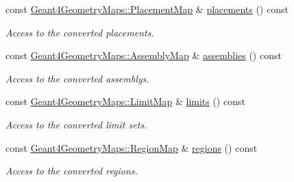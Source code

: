 \begin{Indent}{\bf }
\begin{DoxyCompactItemize}
const \hyperlink{namespace_d_d4hep_1_1_simulation_1_1_geant4_geometry_maps_a587c0a02d3847f03e6427093c90e93d2}{Geant4GeometryMaps::PlacementMap} \& \hyperlink{class_d_d4hep_1_1_simulation_1_1_geant4_detector_construction_sequence_a58bd5c2c34f328ecb506084ba1a8f4a3}{placements} () const 
\begin{DoxyCompactList}\small\item\em Access to the converted placements. \item\end{DoxyCompactList}\item 
const \hyperlink{namespace_d_d4hep_1_1_simulation_1_1_geant4_geometry_maps_ae1f67e315dd299b17e4ea1c58a47b312}{Geant4GeometryMaps::AssemblyMap} \& \hyperlink{class_d_d4hep_1_1_simulation_1_1_geant4_detector_construction_sequence_a914734773cc27cac0e21c92af06427bc}{assemblies} () const 
\begin{DoxyCompactList}\small\item\em Access to the converted assemblys. \item\end{DoxyCompactList}\item 
const \hyperlink{namespace_d_d4hep_1_1_simulation_1_1_geant4_geometry_maps_a338013d6709b82358b8e2490cdba0ed2}{Geant4GeometryMaps::LimitMap} \& \hyperlink{class_d_d4hep_1_1_simulation_1_1_geant4_detector_construction_sequence_a99b5ddba09b53b9fad6193b59c903e79}{limits} () const 
\begin{DoxyCompactList}\small\item\em Access to the converted limit sets. \item\end{DoxyCompactList}\item 
const \hyperlink{namespace_d_d4hep_1_1_simulation_1_1_geant4_geometry_maps_afb7f77d7599fee831bfb2341123e8377}{Geant4GeometryMaps::RegionMap} \& \hyperlink{class_d_d4hep_1_1_simulation_1_1_geant4_detector_construction_sequence_a88b08b2719f3da5bc1a8d4c398c74169}{regions} () const 
\begin{DoxyCompactList}\small\item\em Access to the converted regions. \item\end{DoxyCompactList}\end{DoxyCompactItemize}
\end{Indent}
